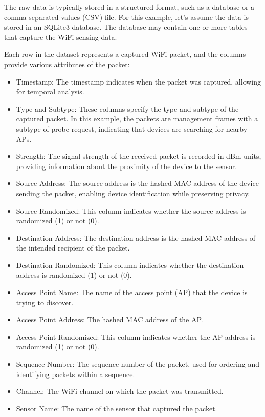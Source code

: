\documentclass[
  letterpaper,
]{scrbook}
\providecommand{\tightlist}{%
  \setlength{\itemsep}{0pt}\setlength{\parskip}{0pt}}\usepackage{longtable,booktabs,array}
\begin{document}
The raw data is typically stored in a structured format, such as a
database or a comma-separated values (CSV) file. For this example, let's
assume the data is stored in an SQLite3 database. The database may
contain one or more tables that capture the WiFi sensing data.

Each row in the dataset represents a captured WiFi packet, and the
columns provide various attributes of the packet:

\begin{itemize}
\tightlist
\item
  Timestamp: The timestamp indicates when the packet was captured,
  allowing for temporal analysis.
\item
  Type and Subtype: These columns specify the type and subtype of the
  captured packet. In this example, the packets are management frames
  with a subtype of probe-request, indicating that devices are searching
  for nearby APs.
\item
  Strength: The signal strength of the received packet is recorded in
  dBm units, providing information about the proximity of the device to
  the sensor.
\item
  Source Address: The source address is the hashed MAC address of the
  device sending the packet, enabling device identification while
  preserving privacy.
\item
  Source Randomized: This column indicates whether the source address is
  randomized (1) or not (0).
\item
  Destination Address: The destination address is the hashed MAC address
  of the intended recipient of the packet.
\item
  Destination Randomized: This column indicates whether the destination
  address is randomized (1) or not (0).
\item
  Access Point Name: The name of the access point (AP) that the device
  is trying to discover.
\item
  Access Point Address: The hashed MAC address of the AP.
\item
  Access Point Randomized: This column indicates whether the AP address
  is randomized (1) or not (0).
\item
  Sequence Number: The sequence number of the packet, used for ordering
  and identifying packets within a sequence.
\item
  Channel: The WiFi channel on which the packet was transmitted.
\item
  Sensor Name: The name of the sensor that captured the packet.
\end{itemize}
\end{document}
